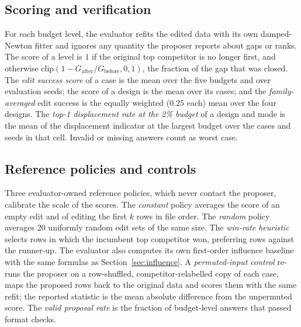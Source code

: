 \documentclass{article}
\begin{document}
\subsection{Scoring and verification}
For each budget level, the evaluator refits the edited data with its own damped-Newton fitter and ignores any quantity the proposer reports about gaps or ranks. The score of a level is $1$ if the original top competitor is no longer first, and otherwise $\mathrm{clip}(1-G_{\text{after}}/G_{\text{before}},0,1)$, the fraction of the gap that was closed. The \emph{edit success score} of a case is the mean over the five budgets and over evaluation seeds; the score of a design is the mean over its cases; and the \emph{family-averaged} edit success is the equally weighted ($0.25$ each) mean over the four designs. The \emph{top-1 displacement rate at the 2\% budget} of a design and mode is the mean of the displacement indicator at the largest budget over the cases and seeds in that cell. Invalid or missing answers count as worst case. %

\subsection{Reference policies and controls}
Three evaluator-owned reference policies, which never contact the proposer, calibrate the scale of the scores. The \emph{constant} policy averages the score of an empty edit and of editing the first $k$ rows in file order. The \emph{random} policy averages 20 uniformly random edit sets of the same size. The \emph{win-rate heuristic} selects rows in which the incumbent top competitor won, preferring rows against the runner-up. The evaluator also computes its own first-order influence baseline with the same formulas as Section~\ref{sec:influence}. %
A \emph{permuted-input control} re-runs the proposer on a row-shuffled, competitor-relabelled copy of each case, maps the proposed rows back to the original data and scores them with the same refit; the reported statistic is the mean absolute difference from the unpermuted score. The \emph{valid proposal rate} is the fraction of budget-level answers that passed format checks.
\end{document}
